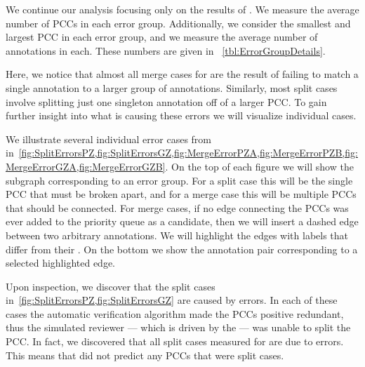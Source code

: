     We continue our analysis focusing only on the results of .
    We measure the average number of PCCs in each error group.
    Additionally, we consider the smallest and largest PCC in each error group, and we measure the average number
      of annotations in each.
    These numbers are given in ~\cref{tbl:ErrorGroupDetails}.

    Here, we notice that almost all merge cases for  are the result of failing to match a single
      annotation to a larger group of annotations.
    Similarly, most split cases involve splitting just one singleton annotation off of a larger PCC.
    To gain further insight into what is causing these errors we will visualize individual cases.


    \ErrorSizeDetails{}

    \ErrorGroupDetails{}

    \FloatBarrier{}

    We illustrate several individual error cases from 
    in~\cref{fig:SplitErrorsPZ,fig:SplitErrorsGZ,fig:MergeErrorPZA,fig:MergeErrorPZB,fig:MergeErrorGZA,fig:MergeErrorGZB}.
    On the top of each figure we will show the subgraph corresponding to an error group.
    For a split case this will be the single PCC that must be broken apart, and for a merge case this will be
      multiple PCCs that should be connected.
    For merge cases, if no edge connecting the PCCs was ever added to the priority queue as a candidate, then we
      will insert a dashed edge between two arbitrary annotations.
    We will highlight the edges with labels that differ from their \groundtruth{}.
    On the bottom we show the annotation pair corresponding to a selected highlighted edge.

    Upon inspection, we discover that the split cases in~\cref{fig:SplitErrorsPZ,fig:SplitErrorsGZ} are caused by
      \groundtruth{} errors.
    In each of these cases the automatic verification algorithm made the PCCs positive redundant, thus the
      simulated reviewer --- which is driven by the \groundtruth{} --- was unable to split the PCC.
    In fact, we discovered that all split cases measured for  are due to \groundtruth{} errors.
    This means that  did not predict any PCCs that were split cases.

